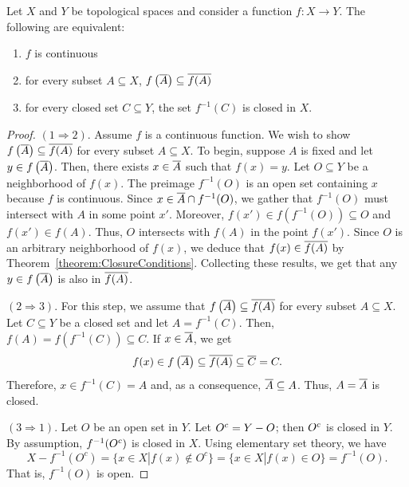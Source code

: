 \begin{theorem} \label{theorem:ContinuityEquivalentConditions}
Let $X$ and $Y$ be topological spaces and consider a function $f \colon X \rightarrow Y$.
The following are equivalent:
\begin{enumerate}
\item $f$ is continuous
\item for every subset $A \subseteq X$, $f \left( \overline{A} \right) \subseteq \overline{ f(A) }$
\item for every closed set $C \subseteq Y$, the set $f^{-1} (C)$ is closed in $X$.
\end{enumerate}
\end{theorem}
\begin{proof}
$(1 \Rightarrow 2)$.
Assume $f$ is a continuous function.
We wish to show $f \left( \overline{A} \right) \subseteq \overline{ f(A) }$ for every subset $A \subseteq X$.
To begin, suppose $A$ is fixed and let $y \in f \left( \overline{A} \right)$.
Then, there exists $x \in \overline{A}$ such that $f(x) = y$.
Let $O \subseteq Y$ be a neighborhood of $f(x)$.
The preimage $f^{-1}(O)$ is an open set containing $x$ because $f$ is continuous.
Since $x \in \overline{A} \cap f^{-1}(O)$, we gather that $f^{-1}(O)$ must intersect with $A$ in some point $x'$.
Moreover, $f(x') \in f \left( f^{-1}(O) \right) \subseteq O$ and $f(x') \in f(A)$.
Thus, $O$ intersects with $f(A)$ in the point $f(x')$.
Since $O$ is an arbitrary neighborhood of $f(x)$, we deduce that $f(x) \in \overline{ f(A) }$ by Theorem~\ref{theorem:ClosureConditions}.
Collecting these results, we get that any $y \in f \left( \overline{A} \right)$ is also in $\overline{ f(A) }$.

$(2 \Rightarrow 3)$.
For this step, we assume that $f \left( \overline{A} \right) \subseteq \overline{ f(A) }$ for every subset $A \subseteq X$.
Let $C \subseteq Y$ be a closed set and let $A = f^{-1} (C)$.
Then, $f(A) = f \left( f^{-1}(C) \right) \subseteq C$.
If $x \in \overline{A}$, we get
\begin{equation*}
f(x) \in f \left( \overline{A} \right) \subseteq \overline{f (A)} \subseteq \overline{C} = C.
\end{equation*}
Therefore, $x \in f^{-1} (C) = A$ and, as a consequence, $\overline{A} \subseteq A$.
Thus, $A = \overline{A}$ is closed.

$(3 \Rightarrow 1)$.
Let $O$ be an open set in $Y$.
Let ${O}^{c} = Y - O$; then ${O}^{c}$ is closed in $Y$.
By assumption, $f^{-1} ({O}^{c})$ is closed in $X$.
Using elementary set theory, we have
\begin{equation*}
X - f^{-1}(O^c) = \{ x\in X | f(x) \notin O^c \} = \{ x \in X | f(x) \in O \} = f^{-1} (O).
\end{equation*}
That is, $f^{-1} (O)$ is open.
\end{proof}

